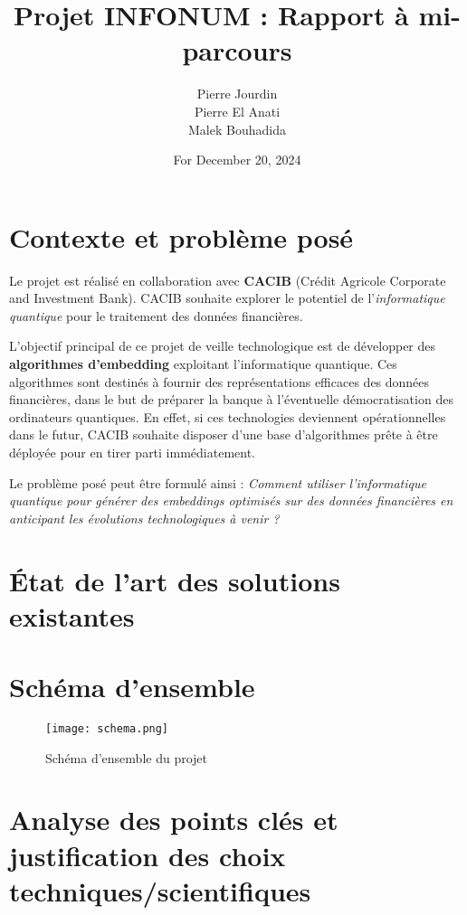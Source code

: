 \documentclass[11pt,a4paper]{article}
\title{\textbf{Projet INFONUM : Rapport à mi-parcours}}
\author{Pierre Jourdin \\
        Pierre El Anati \\
        Malek Bouhadida}
\date{For December 20, 2024}
\begin{document}
\maketitle
\tableofcontents
\newpage

\section{Contexte et problème posé}

Le projet est réalisé en collaboration avec \textbf{CACIB} (Crédit Agricole Corporate and Investment Bank). CACIB souhaite explorer le potentiel de l'\textit{informatique quantique} pour le traitement des données financières.

L'objectif principal de ce projet de veille technologique est de développer des \textbf{algorithmes d'embedding} exploitant l'informatique quantique. Ces algorithmes sont destinés à fournir des représentations efficaces des données financières, dans le but de préparer la banque à l'éventuelle démocratisation des ordinateurs quantiques. En effet, si ces technologies deviennent opérationnelles dans le futur, CACIB souhaite disposer d'une base d'algorithmes prête à être déployée pour en tirer parti immédiatement.

Le problème posé peut être formulé ainsi : \textit{Comment utiliser l'informatique quantique pour générer des embeddings optimisés sur des données financières en anticipant les évolutions technologiques à venir ?}


\section{État de l'art des solutions existantes}

\section{Schéma d'ensemble}

\begin{figure}[h!]
    \centering
    \texttt{[image: schema.png]}
    \caption{Schéma d'ensemble du projet}
    \label{fig:schema}
\end{figure}

\section{Analyse des points clés et justification des choix \\techniques/scientifiques}
\end{document}
